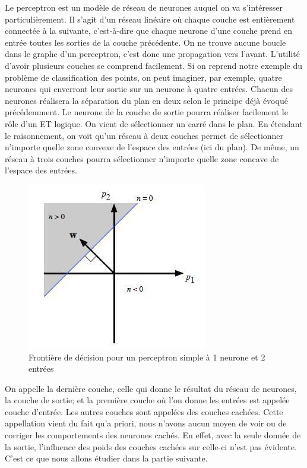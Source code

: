 Le perceptron est un modèle de réseau de neurones auquel on va s’intéresser particulièrement. Il s'agit d'un réseau linéaire où chaque couche est entièrement connectée à la suivante, c'est-à-dire que chaque neurone d'une couche prend en entrée toutes les sorties de la couche précédente. On ne trouve aucune boucle dans le graphe d'un perceptron, c'est donc une propagation vers l'avant.
L’utilité d’avoir plusieurs couches se comprend facilement. Si on reprend notre exemple du problème de classification des points, on peut imaginer, par exemple, quatre neurones qui enverront leur sortie sur un neurone à quatre entrées. Chacun des neurones réalisera la séparation du plan en deux selon le principe déjà évoqué précédemment. Le neurone de la couche de sortie pourra réaliser facilement le rôle d’un ET logique. On vient de sélectionner un carré dans le plan. En étendant le raisonnement, on voit qu’un réseau à deux couches permet de sélectionner n’importe quelle zone convexe de l’espace des entrées (ici du plan). De même, un réseau à trois couches pourra sélectionner n’importe quelle zone concave de l’espace des entrées.

\begin{figure}[h]
  \centerline{\includegraphics[width=0.5\linewidth]{fig/espace1neurone.jpg}}
  \caption{Frontière de décision pour un perceptron simple à 1 neurone et 2 entrées}
  \label{fig:espace1neurone}
\end{figure}

On appelle la dernière couche, celle qui donne le résultat du réseau de neurones, la couche de sortie; et la première couche où l'on donne les entrées est appelée couche d'entrée. Les autres couches sont appelées des couches cachées. Cette appellation vient du fait qu’a priori, nous n’avons aucun moyen de voir ou de corriger les comportements des neurones cachés. En effet, avec la seule donnée de la sortie, l’influence des poids des couches cachées sur celle-ci n'est pas évidente. C'est ce que nous allons étudier dans la partie suivante. 




